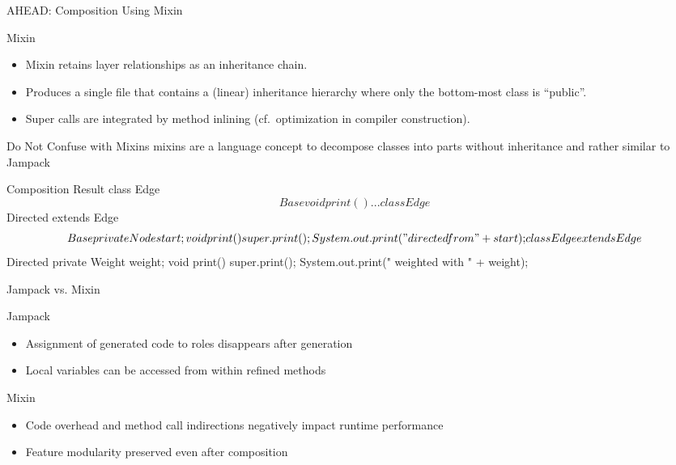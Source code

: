\begin{frame}[fragile]{AHEAD: Composition Using Mixin}
	\begin{fancycolumns}[animation=none]
		\begin{definition}{Mixin}
			\begin{itemize}
				\item Mixin retains layer relationships as an inheritance chain.  
				\item Produces a single file that contains a (linear) inheritance hierarchy where only the bottom-most class is ``public''.
				\item Super calls are integrated by method inlining (cf.\ optimization in compiler construction).
			\end{itemize}
		\end{definition}
		\begin{note}{Do Not Confuse with Mixins} %
			mixins are a language concept to decompose classes into parts without inheritance and rather similar to Jampack
		\end{note}
	\nextcolumn
{\small
\begin{codetight}{Composition Result}
class Edge$$Base {
	void print() { ... }
}
class Edge$$Directed extends Edge$$Base {
	private Node start;
	void print() {
		super.print();
		System.out.print(" directed from " + start);
	}
}
class Edge extends Edge$$Directed {
	private Weight weight;
	void print() {
		super.print();
		System.out.print(" weighted with " + weight);
	}
}
\end{codetight}
}
	\end{fancycolumns}
\end{frame}

\begin{frame}{Jampack vs. Mixin} %
	\begin{fancycolumns}
		\begin{note}{Jampack}
			\begin{itemize}
				\item Assignment of generated code to roles disappears after generation 
				\item Local variables can be accessed from within refined methods
			\end{itemize}
		\end{note}
	\nextcolumn
		\begin{note}{Mixin}
			\begin{itemize}
				\item Code overhead and method call indirections negatively impact runtime performance
				\item Feature modularity preserved even after composition
			\end{itemize}
		\end{note}
	\end{fancycolumns}
\end{frame}

